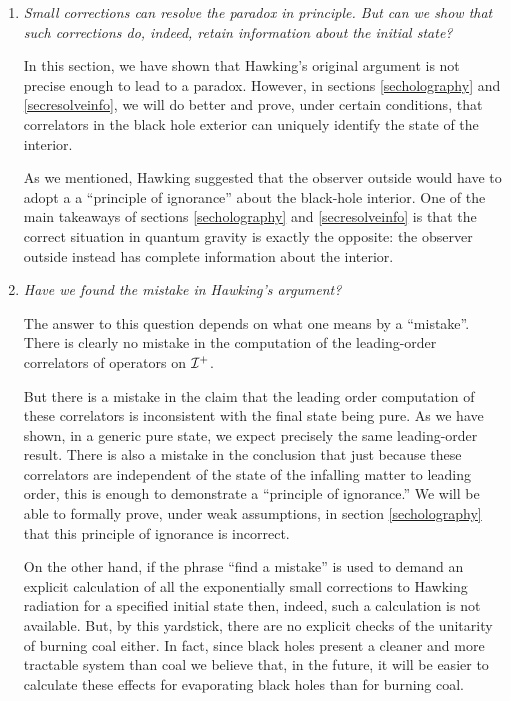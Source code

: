 \documentclass[12pt]{article}
\def \scrip{{\cal I}^{+}}
\begin{document}
\begin{enumerate}[label={\bf Q\arabic*}, series=qseries]
\item
{\em Small corrections can resolve the paradox in principle. But can we show that such corrections do, indeed, retain information about the initial state?}

In this section, we have shown that Hawking's original argument is not precise enough to lead to a paradox. However, in sections \ref{secholography} and \ref{secresolveinfo}, we will do better and prove, under certain conditions, that correlators in the black hole exterior can uniquely identify the state of the interior.

 As we mentioned, Hawking suggested that the observer outside would have to adopt a a ``principle of ignorance'' about the black-hole interior. One of the main
takeaways of sections  \ref{secholography} and \ref{secresolveinfo} is that the correct situation in quantum gravity is exactly the opposite: the observer outside instead has complete information about the interior.



\item
{\em Have we found the mistake in Hawking's argument?}

The answer to this question depends on what one means by a ``mistake''. There is clearly no mistake in the computation of the leading-order correlators of operators on $\scrip$.

But there is a mistake in the claim that the leading order computation of these  correlators is  inconsistent with the final state being pure. As we have shown, in a generic pure state, we expect precisely the same leading-order result. There is also a mistake in the conclusion that just because these correlators are independent of the state of the infalling matter to leading order, this is enough to demonstrate a ``principle of ignorance.'' We will be able to formally prove, under weak assumptions, in section \ref{secholography} that this principle of ignorance is incorrect.


On the other hand, if the phrase  ``find a mistake''  is used to demand an explicit calculation of all the exponentially small corrections to Hawking radiation for a specified initial state then, indeed, such a calculation is not available.  But,  by this yardstick, there are no explicit checks of the unitarity of burning coal either. In fact, since black holes present a cleaner and more tractable system than coal we believe that, in the future, it will be easier to calculate these effects for evaporating black holes than for burning coal.

\end{enumerate}
\end{document}
